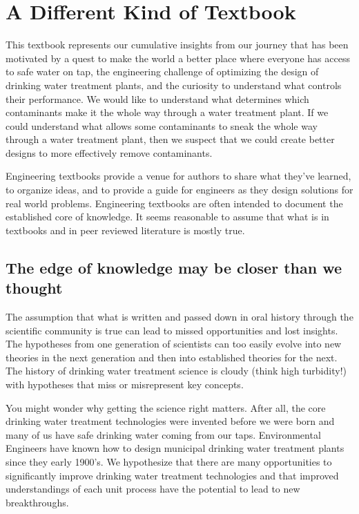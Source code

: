 \documentclass[letterpaper,10pt,english]{sphinxmanual}
\begin{document}
\section{A Different Kind of Textbook}
\label{\detokenize{Introduction/Introduction:a-different-kind-of-textbook}}\label{\detokenize{Introduction/Introduction:heading-a-different-kind-of-textbook}}
This textbook represents our cumulative insights from our journey that has been motivated by a quest to make the world a better place where everyone has access to safe water on tap, the engineering challenge of optimizing the design of drinking water treatment plants, and the curiosity to understand what controls their performance. We would like to understand what determines which contaminants make it the whole way through a water treatment plant. If we could understand what allows some contaminants to sneak the whole way through a water treatment plant, then we suspect that we could create better designs to more effectively remove contaminants.

Engineering textbooks provide a venue for authors to share what they’ve learned, to organize ideas, and to provide a guide for engineers as they design solutions for real world problems. Engineering textbooks are often intended to document the established core of knowledge. It seems reasonable to assume that what is in textbooks and in peer reviewed literature is mostly true.


\subsection{The edge of knowledge may be closer than we thought}
\label{\detokenize{Introduction/Introduction:the-edge-of-knowledge-may-be-closer-than-we-thought}}\label{\detokenize{Introduction/Introduction:heading-edge-of-knowledge}}
The assumption that what is written and passed down in oral history through the scientific community is true can lead to missed opportunities and lost insights. The hypotheses from one generation of scientists can too easily evolve into new theories in the next generation and then into established theories for the next. The history of drinking water treatment science is cloudy (think high turbidity!) with hypotheses that miss or misrepresent key concepts.

You might wonder why getting the science right matters. After all, the core drinking water treatment technologies were invented before we were born and many of us have safe drinking water coming from our taps. Environmental Engineers have known how to design municipal drinking water treatment plants since they early 1900’s. We hypothesize that there are many opportunities to significantly improve drinking water treatment technologies and that improved understandings of each unit process have the potential to lead to new breakthroughs.
\end{document}
